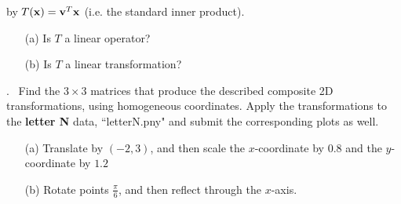 \documentclass[12pt]{article}
\begin{document}
by $T({\bf x}) = {\bf v}^T {\bf x}$ (i.e. the standard inner product).
\begin{itemize}
\item[(a)] Is $T$ a linear operator?
\item[(b)] Is $T$ a linear transformation?
\end{itemize}
\vskip 10pt
.~  Find the $ 3 \times 3$ matrices that produce the described composite 2D transformations, using homogeneous coordinates. Apply the transformations to the {\bf letter N} data, ``letterN.pny" and submit the corresponding plots as well.
\begin{itemize}
\item[(a)] Translate by $(-2, 3)$, and then scale the $x$-coordinate by $0.8$ and the $y$-coordinate by $1.2$
\item[(b)] Rotate points $\frac{\pi}{6}$, and then reflect through the $x$-axis.
\end{itemize} 
\end{document}
